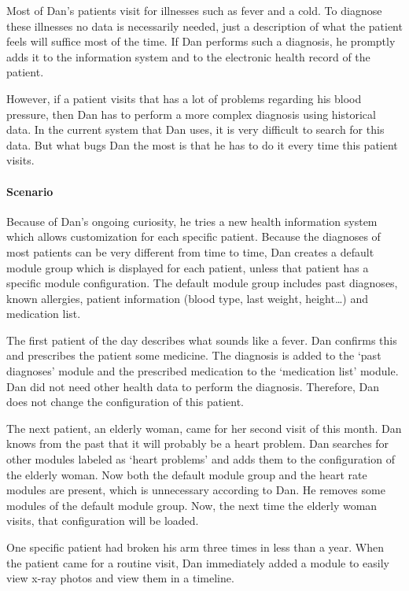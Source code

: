         Most of Dan's patients visit for illnesses such as fever and a cold. To diagnose these illnesses no data is necessarily needed, just a description of what the patient feels will suffice most of the time. If Dan performs such a diagnosis, he promptly adds it to the information system and to the electronic health record of the patient.

        However, if a patient visits that has a lot of problems regarding his blood pressure, then Dan has to perform a more complex diagnosis using historical data. In the current system that Dan uses, it is very difficult to search for this data. But what bugs Dan the most is that he has to do it every time this patient visits.

        \paragraph{Scenario} Because of Dan's ongoing curiosity, he tries a new health information system which allows customization for each specific patient. Because the diagnoses of most patients can be very different from time to time, Dan creates a default module group which is displayed for each patient, unless that patient has a specific module configuration. The default module group includes past diagnoses, known allergies, patient information (blood type, last weight, height\ldots) and medication list.

        The first patient of the day describes what sounds like a fever. Dan confirms this and prescribes the patient some medicine. The diagnosis is added to the `past diagnoses' module and the prescribed medication to the `medication list' module. Dan did not need other health data to perform the diagnosis. Therefore, Dan does not change the configuration of this patient.

        The next patient, an elderly woman, came for her second visit of this month. Dan knows from the past that it will probably be a heart problem. Dan searches for other modules labeled as `heart problems' and adds them to the configuration of the elderly woman. Now both the default module group and the heart rate modules are present, which is unnecessary according to Dan. He removes some modules of the default module group. Now, the next time the elderly woman visits, that configuration will be loaded.

        One specific patient had broken his arm three times in less than a year. When the patient came for a routine visit, Dan immediately added a module to easily view x-ray photos and view them in a timeline.\\

